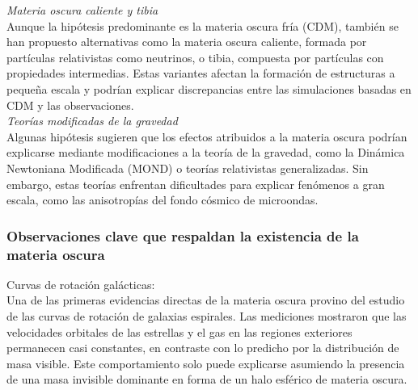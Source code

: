 \documentclass{article}
\begin{document}
\textit{Materia oscura caliente y tibia} \\
Aunque la hipótesis predominante es la materia oscura fría (CDM), también se han propuesto alternativas como la materia oscura caliente, formada por partículas relativistas como neutrinos, o tibia, compuesta por partículas con propiedades intermedias. Estas variantes afectan la formación de estructuras a pequeña escala y podrían explicar discrepancias entre las simulaciones basadas en CDM y las observaciones. \\

\textit{Teorías modificadas de la gravedad} \\
Algunas hipótesis sugieren que los efectos atribuidos a la materia oscura podrían explicarse mediante modificaciones a la teoría de la gravedad, como la Dinámica Newtoniana Modificada (MOND) o teorías relativistas generalizadas. Sin embargo, estas teorías enfrentan dificultades para explicar fenómenos a gran escala, como las anisotropías del fondo cósmico de microondas. \\

\subsubsection{Observaciones clave que respaldan la existencia de la materia oscura}
Curvas de rotación galácticas: \\
Una de las primeras evidencias directas de la materia oscura provino del estudio de las curvas de rotación de galaxias espirales. Las mediciones mostraron que las velocidades orbitales de las estrellas y el gas en las regiones exteriores permanecen casi constantes, en contraste con lo predicho por la distribución de masa visible. Este comportamiento solo puede explicarse asumiendo la presencia de una masa invisible dominante en forma de un halo esférico de materia oscura. \\
\end{document}
